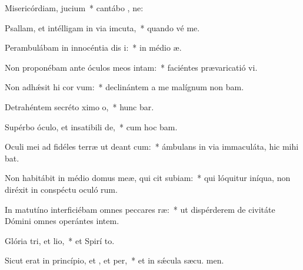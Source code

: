 \item Misericórdiam,  jucium~* cantábo , ne:
\item Psallam, et intélligam in via imcuta,~* quando vé  me.
\item Perambulábam in innocéntia dis i:~* in médio  æ.
\item Non proponébam ante óculos meos  intam:~* faciéntes prævaricatió vi.
\item Non adhǽsit hi cor vum:~* declinántem a me malígnum non bam.
\item Detrahéntem secréto ximo o,~* hunc bar.
\item Supérbo óculo, et insatibili de,~* cum hoc  bam.
\item Oculi mei ad fidéles terræ ut deant cum:~* ámbulans in via immaculáta, hic mihi bat.
\item Non habitábit in médio domus meæ, qui cit subiam:~* qui lóquitur iníqua, non diréxit in conspéctu oculó rum.
\item In matutíno interficiébam omnes peccares ræ:~* ut dispérderem de civitáte Dómini omnes operántes intem.
\item Glória tri, et lio,~* et Spirí to.
\item Sicut erat in princípio, et , et per,~* et in sǽcula sæcu. men.
